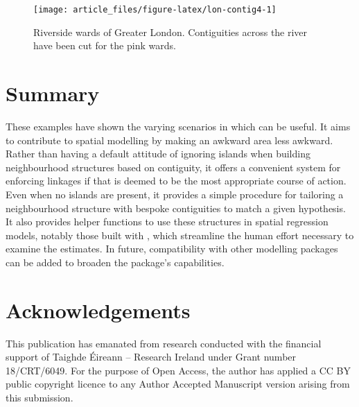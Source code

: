 \begin{figure}

{\centering \texttt{[image: article\_files/figure-latex/lon-contig4-1]} 

}

\caption{Riverside wards of Greater London. Contiguities across the river have been cut for the pink wards. }\label{fig:lon-contig4}
\end{figure}

\section{Summary}\label{summary}

These examples have shown the varying scenarios in which  can be useful. It aims to contribute to spatial modelling by making an awkward area less awkward. Rather than having a default attitude of ignoring islands when building neighbourhood structures based on contiguity, it offers a convenient system for enforcing linkages if that is deemed to be the most appropriate course of action. Even when no islands are present, it provides a simple procedure for tailoring a neighbourhood structure with bespoke contiguities to match a given hypothesis. It also provides helper functions to use these structures in spatial regression models, notably those built with , which streamline the human effort necessary to examine the estimates. In future, compatibility with other modelling packages can be added to broaden the package's capabilities.

\section{Acknowledgements}\label{acknowledgements}

This publication has emanated from research conducted with the financial support of Taighde Éireann -- Research Ireland under Grant number 18/CRT/6049. For the purpose of Open Access, the author has applied a CC BY public copyright licence to any Author Accepted Manuscript version arising from this submission.



\address{%
Kevin Horan\\
Hamilton Institute, Maynooth University\\%
Maynooth\\ Co.~Kildare, Ireland\\
%
\url{https://github.com/horankev}\\%
\textit{ORCiD: \href{https://orcid.org/0009-0003-9378-0084}{0009-0003-9378-0084}}\\%
\href{mailto:kevin.horan.2021@mumail.ie}{\nolinkurl{kevin.horan.2021@mumail.ie}}%
}

